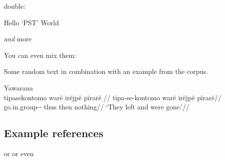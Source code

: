 \documentclass{memoir}
\begin{document}
double:

\pex\label{multiparttest} \a\label{test2} Hello  `PST'
\a\label{test3} World

\emph{and} more \xe

You can even mix them:

\pex\label{multiparttest2} \a\label{test4} Some random text in
combination with an example from the corpus.

\a Yawarana \\
\label{ctorat-30}    \begingl
    \glpreamble  tipasekontomo warë irëjpë pïrarë //
    \gla tipa-se-kontomo warë irëjpë pïrarë//
    \glb go.in.group-- thus then nothing//
        \glft ‘They left and were gone.’//  
    \endgl 

\xe

\subsection{Example references}


 or  or even 




\printbibliography
\end{document}
